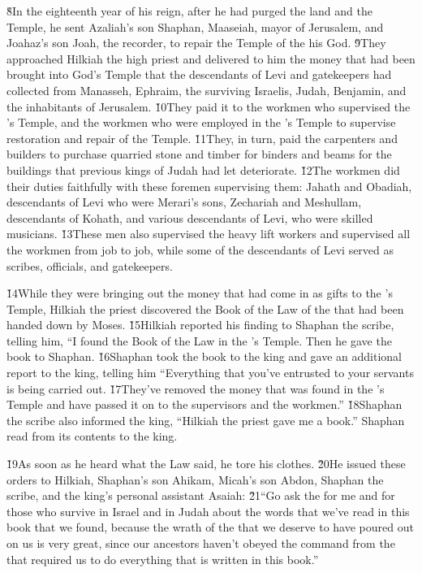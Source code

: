 \v{8}In the eighteenth year of his reign, after he had purged the land and the Temple, he sent Azaliah's son Shaphan, Maaseiah, mayor of Jerusalem, and Joahaz's son Joah, the recorder, to repair the Temple of the  his God. \v{9}They approached Hilkiah the high priest and delivered to him the money that had been brought into God's Temple that the descendants of Levi and gatekeepers had collected from Manasseh, Ephraim, the surviving Israelis, Judah, Benjamin, and the inhabitants of Jerusalem. \v{10}They paid it to the workmen who supervised the 's Temple, and the workmen who were employed in the 's Temple to supervise restoration and repair of the Temple. \v{11}They, in turn, paid the carpenters and builders to purchase quarried stone and timber for binders and beams for the buildings that previous kings of Judah had let deteriorate. \v{12}The workmen did their duties faithfully with these foremen supervising them: Jahath and Obadiah, descendants of Levi who were Merari's sons, Zechariah and Meshullam, descendants of Kohath, and various descendants of Levi, who were skilled musicians. \v{13}These men also supervised the heavy lift workers and supervised all the workmen from job to job, while some of the descendants of Levi served as scribes, officials, and gatekeepers.

\v{14}While they were bringing out the money that had come in as gifts to the 's Temple, Hilkiah the priest discovered the Book of the Law of the  that had been handed down by Moses. \v{15}Hilkiah reported his finding to Shaphan the scribe, telling him, ``I found the Book of the Law in the 's Temple. Then he gave the book to Shaphan. \v{16}Shaphan took the book to the king and gave an additional report to the king, telling him ``Everything that you've entrusted to your servants is being carried out. \v{17}They've removed the money that was found in the 's Temple and have passed it on to the supervisors and the workmen.'' \v{18}Shaphan the scribe also informed the king, ``Hilkiah the priest gave me a book.'' Shaphan read from its contents to the king.

\v{19}As soon as he heard what the Law said, he tore his clothes. \v{20}He issued these orders to Hilkiah, Shaphan's son Ahikam, Micah's son Abdon, Shaphan the scribe, and the king's personal assistant Asaiah: \v{21}``Go ask the  for me and for those who survive in Israel and in Judah about the words that we've read in this book that we found, because the wrath of the  that we deserve to have poured out on us is very great, since our ancestors haven't obeyed the command from the  that required us to do everything that is written in this book.''

